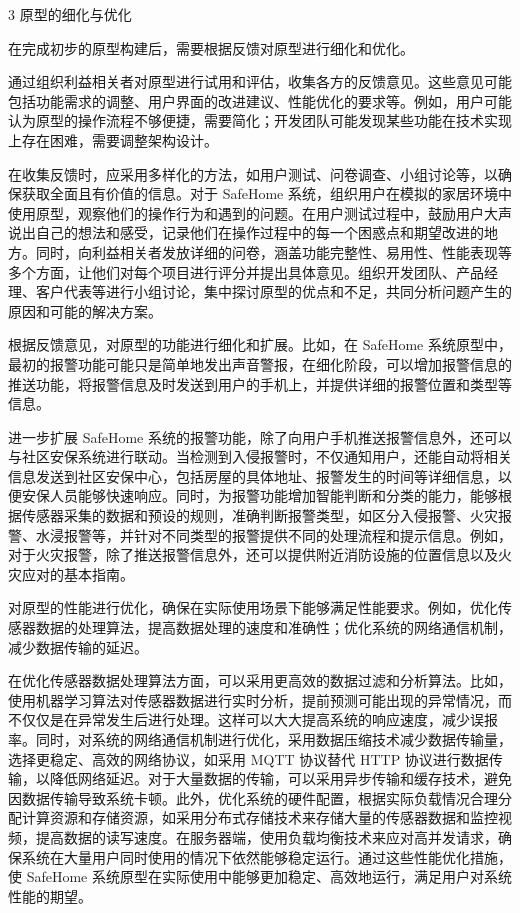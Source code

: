 3 原型的细化与优化

在完成初步的原型构建后，需要根据反馈对原型进行细化和优化。

通过组织利益相关者对原型进行试用和评估，收集各方的反馈意见。这些意见可能包括功能需求的调整、用户界面的改进建议、性能优化的要求等。例如，用户可能认为原型的操作流程不够便捷，需要简化；开发团队可能发现某些功能在技术实现上存在困难，需要调整架构设计。

在收集反馈时，应采用多样化的方法，如用户测试、问卷调查、小组讨论等，以确保获取全面且有价值的信息。对于 SafeHome 系统，组织用户在模拟的家居环境中使用原型，观察他们的操作行为和遇到的问题。在用户测试过程中，鼓励用户大声说出自己的想法和感受，记录他们在操作过程中的每一个困惑点和期望改进的地方。同时，向利益相关者发放详细的问卷，涵盖功能完整性、易用性、性能表现等多个方面，让他们对每个项目进行评分并提出具体意见。组织开发团队、产品经理、客户代表等进行小组讨论，集中探讨原型的优点和不足，共同分析问题产生的原因和可能的解决方案。

根据反馈意见，对原型的功能进行细化和扩展。比如，在 SafeHome 系统原型中，最初的报警功能可能只是简单地发出声音警报，在细化阶段，可以增加报警信息的推送功能，将报警信息及时发送到用户的手机上，并提供详细的报警位置和类型等信息。

进一步扩展 SafeHome 系统的报警功能，除了向用户手机推送报警信息外，还可以与社区安保系统进行联动。当检测到入侵报警时，不仅通知用户，还能自动将相关信息发送到社区安保中心，包括房屋的具体地址、报警发生的时间等详细信息，以便安保人员能够快速响应。同时，为报警功能增加智能判断和分类的能力，能够根据传感器采集的数据和预设的规则，准确判断报警类型，如区分入侵报警、火灾报警、水浸报警等，并针对不同类型的报警提供不同的处理流程和提示信息。例如，对于火灾报警，除了推送报警信息外，还可以提供附近消防设施的位置信息以及火灾应对的基本指南。

对原型的性能进行优化，确保在实际使用场景下能够满足性能要求。例如，优化传感器数据的处理算法，提高数据处理的速度和准确性；优化系统的网络通信机制，减少数据传输的延迟。

在优化传感器数据处理算法方面，可以采用更高效的数据过滤和分析算法。比如，使用机器学习算法对传感器数据进行实时分析，提前预测可能出现的异常情况，而不仅仅是在异常发生后进行处理。这样可以大大提高系统的响应速度，减少误报率。同时，对系统的网络通信机制进行优化，采用数据压缩技术减少数据传输量，选择更稳定、高效的网络协议，如采用 MQTT 协议替代 HTTP 协议进行数据传输，以降低网络延迟。对于大量数据的传输，可以采用异步传输和缓存技术，避免因数据传输导致系统卡顿。此外，优化系统的硬件配置，根据实际负载情况合理分配计算资源和存储资源，如采用分布式存储技术来存储大量的传感器数据和监控视频，提高数据的读写速度。在服务器端，使用负载均衡技术来应对高并发请求，确保系统在大量用户同时使用的情况下依然能够稳定运行。通过这些性能优化措施，使 SafeHome 系统原型在实际使用中能够更加稳定、高效地运行，满足用户对系统性能的期望。

